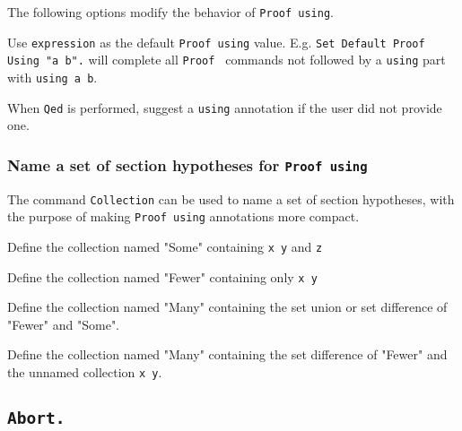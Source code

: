 The following options modify the behavior of {\tt Proof using}.


  Use {\tt expression} as the default {\tt Proof using} value.
  E.g. {\tt Set Default Proof Using "a b".} will complete all {\tt Proof }
  commands not followed by a {\tt using} part with {\tt using a b}.


  When {\tt Qed} is performed, suggest a {\tt using} annotation if
  the user did not provide one.

% 
% 
\subsubsection[\tt Collection]{Name a set of section hypotheses for {\tt Proof using}}
\label{Collection}

The command {\tt Collection} can be used to name a set of section hypotheses,
with the purpose of making {\tt Proof using} annotations more compact.


  Define the collection named "Some" containing {\tt x y} and {\tt z} 

  
  Define the collection named "Fewer" containing only {\tt x y} 

  
  Define the collection named "Many" containing the set union or set difference
  of "Fewer" and "Some".


  Define the collection named "Many" containing the set difference
  of "Fewer" and the unnamed collection {\tt x y}.

\subsection[\tt Abort.]{\tt Abort.}


